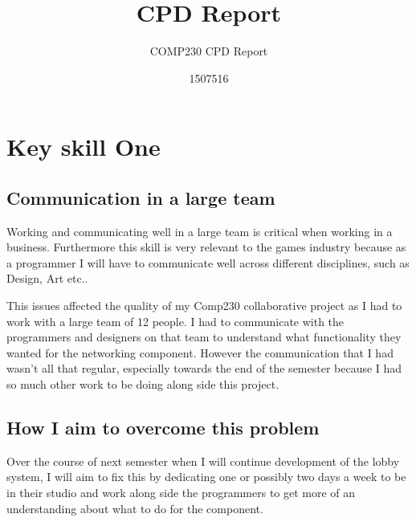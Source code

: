 \documentclass{scrartcl}
\title{CPD Report}
\subtitle{COMP230 CPD Report}
\author{1507516}
\begin{document}
\maketitle






\section{Key skill One}
\subsection{Communication in a large team}

Working and communicating well in a large team is critical when working in a business. Furthermore this skill is very relevant to the games industry because as a programmer I will have to communicate well across different disciplines, such as Design, Art etc..

This issues affected the quality of my Comp230 collaborative project as I had to work with a large team of 12 people. I had to communicate with the programmers and designers on that team to understand what functionality they wanted for the networking component. However the communication that I had wasn't all that regular, especially towards the end of the semester because I had so much other work to be doing along side this project.


\subsection{How I aim to overcome this problem}
Over the course of next semester when I will continue development of the lobby system, I will aim to fix this by dedicating one or possibly two days a week to be in their studio and work along side the programmers to get more of an understanding about what to do for the component.
\end{document}
